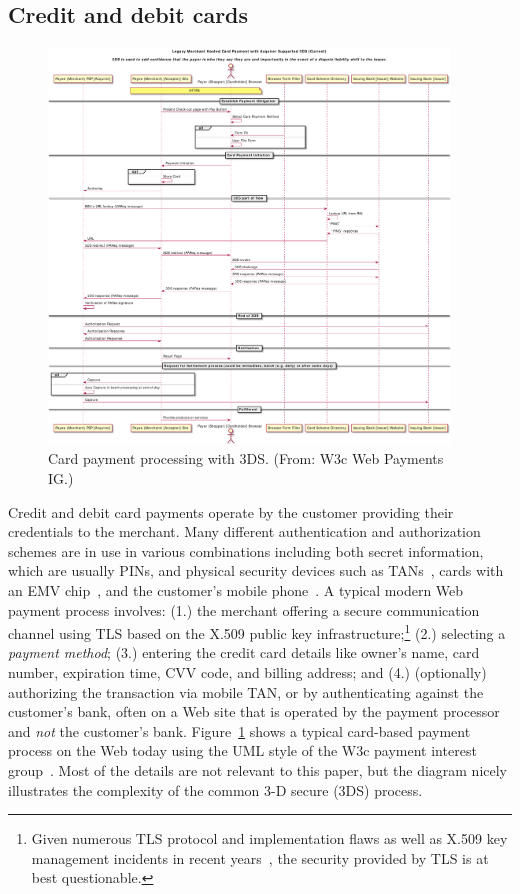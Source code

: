 \documentclass{llncs}
\begin{document}
\subsection{Credit and debit cards}

\begin{figure}[h!]
\begin{center}
\includegraphics[width=0.95\textwidth]{figs/cc3ds.pdf}
\end{center}
\caption{Card payment processing with 3DS. (From: W3c Web Payments IG.)}
\label{fig:cc3ds}
\end{figure}

Credit and debit card payments operate by the customer providing their
credentials to the merchant.  Many different
authentication and authorization schemes are in use in various
combinations including both secret information, which are usually PINs, and
physical security devices such as TANs~\cite{kobil2016tan}, cards with an EMV chip~\cite{emv}, and
 the customer's mobile phone~\cite{mtan}.
A typical modern Web payment process involves:
{(1.)} the merchant offering a secure communication channel
using TLS based on the X.509 public key infrastructure;\footnote{Given
numerous TLS protocol and implementation flaws as well as X.509 key
management incidents in recent years~\cite{holz2014}, the security
provided by TLS is at best questionable.}
{(2.)} selecting a {\em payment method};
{(3.)} entering the credit card details like owner's name,
 card number, expiration time, CVV code, and billing address; and
{(4.)} (optionally) authorizing the transaction via mobile TAN, or
 by authenticating against the customer's bank,
often on a Web site that is operated by the payment
processor and {\em not} the customer's bank.  Figure~\ref{fig:cc3ds}
shows a typical card-based payment process on the Web today using the
UML style of the W3c payment interest group~\cite{pigs}.  Most of the details
are not relevant to this paper, but the diagram nicely illustrates the
complexity of the common 3-D secure (3DS) process.
\end{document}
